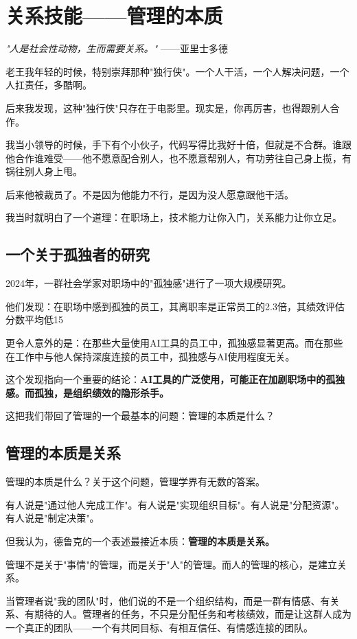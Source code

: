 \chapter{关系技能——管理的本质}


\textit{"人是社会性动物，生而需要关系。"}
——亚里士多德


老王我年轻的时候，特别崇拜那种"独行侠"。一个人干活，一个人解决问题，一个人扛责任，多酷啊。

后来我发现，这种"独行侠"只存在于电影里。现实是，你再厉害，也得跟别人合作。

我当小领导的时候，手下有个小伙子，代码写得比我好十倍，但就是不合群。谁跟他合作谁难受——他不愿意配合别人，也不愿意帮别人，有功劳往自己身上揽，有锅往别人身上甩。

后来他被裁员了。不是因为他能力不行，是因为没人愿意跟他干活。

我当时就明白了一个道理：在职场上，技术能力让你入门，关系能力让你立足。

\section{一个关于孤独者的研究}


2024年，一群社会学家对职场中的"孤独感"进行了一项大规模研究。

他们发现：在职场中感到孤独的员工，其离职率是正常员工的2.3倍，其绩效评估分数平均低15%

更令人意外的是：在那些大量使用AI工具的员工中，孤独感显著更高。而在那些在工作中与他人保持深度连接的员工中，孤独感与AI使用程度无关。

这个发现指向一个重要的结论：\textbf{AI工具的广泛使用，可能正在加剧职场中的孤独感。而孤独，是组织绩效的隐形杀手。}

这把我们带回了管理的一个最基本的问题：管理的本质是什么？

\section{管理的本质是关系}


管理的本质是什么？关于这个问题，管理学界有无数的答案。

有人说是"通过他人完成工作"。有人说是"实现组织目标"。有人说是"分配资源"。有人说是"制定决策"。

但我认为，德鲁克的一个表述最接近本质：\textbf{管理的本质是关系。}

管理不是关于"事情"的管理，而是关于"人"的管理。而人的管理的核心，是建立关系。

当管理者说"我的团队"时，他们说的不是一个组织结构，而是一群有情感、有关系、有期待的人。管理者的任务，不只是分配任务和考核绩效，而是让这群人成为一个真正的团队——一个有共同目标、有相互信任、有情感连接的团队。

